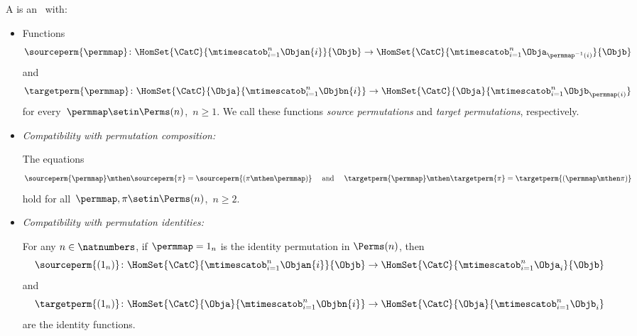 \begin{ctdefinition}
    \label{def:symmetric-stacking-category}
    A  is an  ~\CatC with:

    \constit

    \begin{itemize}
        \item Functions
              \begin{equation}
                  \sourceperm{\permmap} \colon \HomSet{\CatC}{\mtimescatob_{i=1}^n \Objan{i}}{\Objb} \to \HomSet{\CatC}{\mtimescatob_{i=1}^n \Obja_{\permmap^{-1}(i)}}{\Objb}
              \end{equation}
              and
              \begin{equation}
                  \targetperm{\permmap} \colon \HomSet{\CatC}{\Obja}{\mtimescatob_{i=1}^n \Objbn{i}} \to \HomSet{\CatC}{\Obja}{\mtimescatob_{i=1}^n \Objb_{\permmap(i)}}
              \end{equation}
              for every~$\permmap \setin \Perms(n)$,~$n \geq 1$.
              We call these functions \emph{source permutations} and \emph{target permutations}, respectively.
    \end{itemize}

    \condit

    \begin{itemize}

        \item \emph{Compatibility with permutation composition:}

              The equations
              \begin{equation}
                  \label{eq:perm-compatibility-with-perm-comp}
                  \sourceperm{\permmap} \mthen \sourceperm{\pi} = \sourceperm{(\pi\mthen\permmap)}
                  \quad \text{ and } \quad
                  \targetperm{\permmap} \mthen \targetperm{\pi} = \targetperm{(\permmap \mthen \pi)}
              \end{equation}
              hold for all~$\permmap, \pi \setin \Perms(n)$,~$n \geq 2$.

        \item \emph{Compatibility with permutation identities:}

              For any $n \in \natnumbers$, if $\permmap = 1_n$ is the identity permutation in $\Perms(n)$, then
              \begin{equation}
                  \label{eq:perm-compatibility-with-perm-identity-1}
                  \sourceperm{(1_n)} \colon \HomSet{\CatC}{\mtimescatob_{i=1}^n \Objan{i}}{\Objb} \to \HomSet{\CatC}{\mtimescatob_{i=1}^n \Obja_{i}}{\Objb}
              \end{equation}
              and
              \begin{equation}
                  \label{eq:perm-compatibility-with-perm-identity-2}
                  \targetperm{(1_n)} \colon \HomSet{\CatC}{\Obja}{\mtimescatob_{i=1}^n \Objbn{i}} \to \HomSet{\CatC}{\Obja}{\mtimescatob_{i=1}^n \Objb_i}
              \end{equation}
              are the identity functions.


\end{itemize}
\end{ctdefinition}
